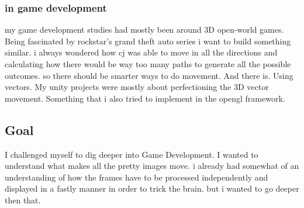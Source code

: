 
            \subsubsection{in game development}
                my game development studies had mostly been around 3D open-world games. Being fascinated by rockstar's grand theft auto series i want to build something similar. i always wondered how cj was able to move in all the directions and calculating how there would be way too many paths to generate all the possible outcomes. so there should be smarter ways to do movement.
                And there is. Using vectors.
                My unity projects were mostly about perfectioning the 3D vector movement. Something that i also tried to implement in the opengl framework.   

        \subsection{Goal}
            I challenged myself to dig deeper into Game Development. I wanted to understand what makes all the pretty images move. i already had somewhat of an understanding of how the frames have to be processed independently and displayed in a fastly manner in order to trick the brain. but i wanted to go deeper then that.

